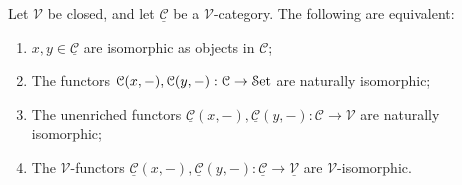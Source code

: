\begin{lemma}\label{lma:3.4}
	Let $\mathcal{V} $ be closed, and let $\underline{\mathcal{C} } $ be a $\mathcal{V} $-category. The following are equivalent:
	\begin{enumerate}
		\item $x,y\in\underline{\mathcal{C} } $ are isomorphic as objects in $\mathcal{C} $;
		\item The functors $\mathcal{C} (x,-),\mathcal{C} (y,-): \mathcal{C}  \to \mathcal{S}\mathrm{et} $ are naturally isomorphic;
		\item The unenriched functors $\underline{\mathcal{C} } (x,-),\underline{\mathcal{C} } (y,-): \mathcal{C}  \to \mathcal{V} $ are naturally isomorphic;
		\item The $\mathcal{V} $-functors $\underline{\mathcal{C} } (x,-),\underline{\mathcal{C}} (y,-): \underline{\mathcal{C} }  \to \underline{\mathcal{V} } $ are $\mathcal{V} $-isomorphic.
	\end{enumerate}
\end{lemma}
